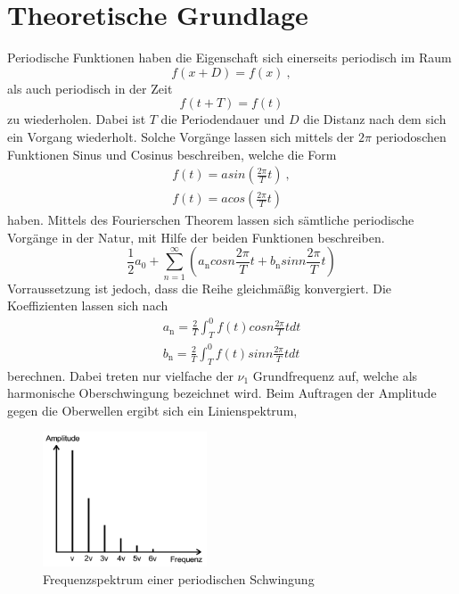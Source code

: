\section{Theoretische Grundlage}
\label{sec:Theorie}
Periodische Funktionen haben die Eigenschaft sich einerseits periodisch im Raum
\begin{equation}
  f(x + D) = f(x) \ ,
  \label{eqn:f(x)}
\end{equation}
als auch periodisch in der Zeit
\begin{equation}
  f(t + T) =f(t)
  \label{eqn:f(t)}
\end{equation}
zu wiederholen. Dabei ist $T$ die Periodendauer und $D$ die Distanz nach dem sich ein Vorgang wiederholt. Solche Vorgänge lassen sich mittels der $2 \pi$ periodoschen Funktionen Sinus und Cosinus beschreiben, welche die Form
\begin{eqnarray}
  f(t) = a sin \left( \frac{2 \pi}{T} t \right) \ ,	\\
  f(t) = a cos \left( \frac{2 \pi}{T} t \right)
  \label{eqn:sin}
\end{eqnarray}
haben. Mittels des Fourierschen Theorem lassen sich sämtliche periodische Vorgänge in der Natur, mit Hilfe der beiden Funktionen beschreiben.
\begin{equation}
  \frac{1}{2} a_0 + \sum^{\infty}_{n=1} \left( a_\text{n} cos n \frac{2 \pi}{T} t + b_\text{n} sin n \frac{2 \pi}{T} t \right)
  \label{eqn:fourier}
\end{equation}
Vorraussetzung ist jedoch, dass die Reihe gleichmäßig konvergiert. Die Koeffizienten lassen sich nach
\begin{eqnarray}
  a_\text{n} = \frac{2}{T} \int^0_T f(t) cos n \frac{2 \pi}{T} t dt	\\
  b_\text{n} = \frac{2}{T} \int^0_T f(t) sin n \frac{2 \pi}{T} t dt
  \label{eqn:Koef}
\end{eqnarray}
berechnen. Dabei treten nur vielfache der $\nu_1$ Grundfrequenz auf, welche als harmonische Oberschwingung bezeichnet wird. Beim Auftragen der Amplitude gegen die Oberwellen ergibt sich ein Linienspektrum,
\begin{figure}
  \centering
  \includegraphics[height=4cm]{picture/Frequenzspektrum.png}
  \caption{Frequenzspektrum einer periodischen Schwingung}
  \label{fig:fre}
\end{figure}
